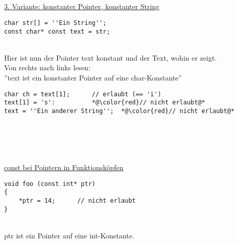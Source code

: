\\ \\ \\ \\
\underline{3. Variante: konstanter Pointer, konstanter String}\\
\noindent
\begin{minipage}{\linewidth}
\begin{lstlisting}
char str[] = ''Ein String'';
const char* const text = str;
\end{lstlisting}
\end{minipage}
\\
Hier ist nun der Pointer text konstant und der Text, wohin er zeigt.\\
Von rechts nach links lesen:\\''text ist ein konstanter Pointer auf eine char-Konstante''\\
\noindent
\begin{minipage}{\linewidth}
\begin{lstlisting}
char ch = text[1];		// erlaubt (== 'i')
text[1] = 's':			*@\color{red}// nicht erlaubt@*
text = ''Ein anderer String'';	*@\color{red}// nicht erlaubt@*
\end{lstlisting}
\end{minipage}
\\ \\ \\ \\
\underline{const bei Pointern in Funktionsköpfen}\\
\noindent
\begin{minipage}{\linewidth}
\begin{lstlisting}
void foo (const int* ptr)
{
	*ptr = 14;		// nicht erlaubt
}
\end{lstlisting}
\end{minipage}
\\
ptr ist ein Pointer auf eine int-Konstante.
\\

